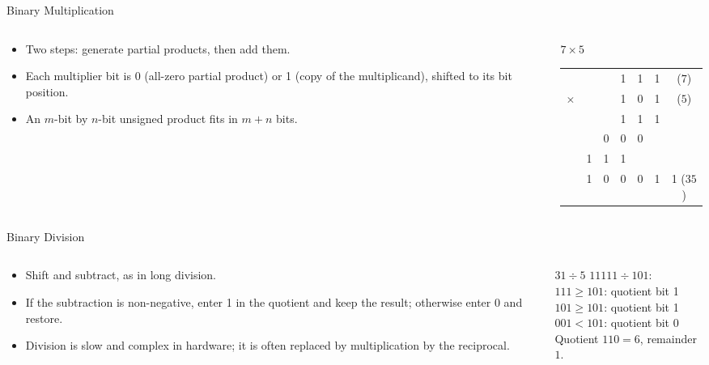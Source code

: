 \documentclass[9pt,aspectratio=169,xcolor=table]{beamer}
\begin{document}
\begin{frame}{Binary Multiplication}
  \begin{columns}[c]
  \begin{column}{.5\textwidth}
    \begin{itemize}\small\itemsep3pt
      \item Two steps: generate \alert{partial products}, then add them.
      \item Each multiplier bit is 0 (all-zero partial product) or 1 (copy of the multiplicand), shifted to its bit position.
      \item An $m$-bit by $n$-bit unsigned product fits in $m + n$ bits.
    \end{itemize}
  \end{column}
  \begin{column}{.48\textwidth}
    \begin{block}{$7 \times 5$}
      \small
      \begin{tabular}{r cccccc}
        & & & 1 & 1 & 1 & ($7$)\\
        $\times$ & & & 1 & 0 & 1 & ($5$)\\
        \hline
        & & & 1 & 1 & 1 & \\
        & & 0 & 0 & 0 & & \\
        & 1 & 1 & 1 & & & \\
        \hline
        & 1 & 0 & 0 & 0 & 1 & 1 ($35$)\\
      \end{tabular}
    \end{block}
  \end{column}
  \end{columns}
\end{frame}

\begin{frame}{Binary Division}
  \begin{columns}[c]
  \begin{column}{.5\textwidth}
    \begin{itemize}\small\itemsep3pt
      \item \alert{Shift and subtract}, as in long division.
      \item If the subtraction is non-negative, enter 1 in the quotient and keep the result; otherwise enter 0 and restore.
      \item Division is slow and complex in hardware; it is often replaced by multiplication by the reciprocal.
    \end{itemize}
  \end{column}
  \begin{column}{.48\textwidth}
    \begin{block}{$31 \div 5$}
      \small $11111 \div 101$:\\
      $111 \ge 101$: quotient bit 1\\
      $101 \ge 101$: quotient bit 1\\
      $001 < 101$: quotient bit 0\\[1mm]
      Quotient $110 = 6$, remainder $1$.
    \end{block}
  \end{column}
  \end{columns}
\end{frame}
\end{document}

